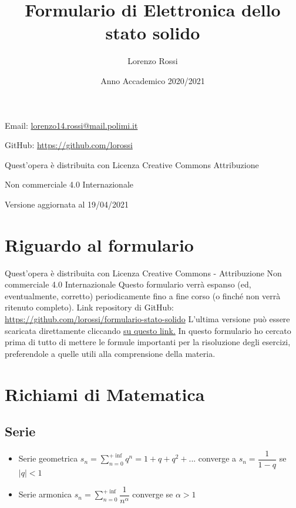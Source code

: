 \documentclass{article}
\title{\Huge Formulario di Elettronica dello stato solido}
\author{\LARGE Lorenzo Rossi}
\date{\LARGE Anno Accademico 2020/2021}
\begin{document}
\maketitle

\vspace{18em}

\large
\begin{doublespacing}\hypersetup{
    urlcolor=black,
  }
  \centerline{Email: \href{mailto://lorenzo14.rossi@mail.polimi.it}{lorenzo14.rossi@mail.polimi.it}}
  \centerline{GitHub: \url{https://github.com/lorossi}}

  \vspace{18em}
  \centerline{Quest'opera è distribuita con Licenza Creative Commons Attribuzione}
  \centerline{Non commerciale 4.0 Internazionale \ccbynceu}
  \centerline{Versione aggiornata al 19/04/2021}
\end{doublespacing}
\newpage


\tableofcontents
\clearpage
{}
\newpage

\section{Riguardo al formulario}
Quest'opera è distribuita con Licenza Creative Commons - Attribuzione Non commerciale 4.0 Internazionale \ccbynceu \newline
Questo formulario verrà espanso (ed, eventualmente, corretto) periodicamente fino a fine corso (o finché non verrà ritenuto completo). \newline
Link repository di GitHub: \url{https://github.com/lorossi/formulario-stato-solido} \newline
L'ultima versione può essere scaricata direttamente cliccando \href{https://github.com/lorossi/formulario-stato-solido/raw/master/formulario-elettronica-dello-stato-solido.pdf}{su questo link.} \newline
In questo formulario ho cercato prima di tutto di mettere le formule importanti per la risoluzione degli esercizi, preferendole a quelle utili alla comprensione della materia.

\section{Richiami di Matematica}
\subsection{Serie}
\begin{itemize}
  \item Serie geometrica \( \displaystyle  s_n = \sum_{n=0}^{+\inf} q^n = 1 + q + q^2 + ... \) converge a \( s_n = \dfrac{1}{1-q} \) se \( |q| < 1 \)
  \item Serie armonica \( \displaystyle s_n = \sum_{n=0}^{+\inf} \dfrac{1}{n ^ \alpha} \) converge se \( \alpha > 1 \)
\end{itemize}
\end{document}
